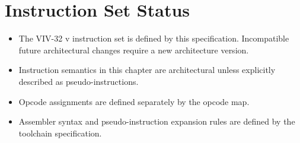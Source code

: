 \section{Instruction Set Status}

\begin{itemize}
  \item The VIV-32 v\version{} instruction set is defined by this specification.
        Incompatible future architectural changes require a new architecture version.
  \item Instruction semantics in this chapter are architectural unless explicitly
        described as pseudo-instructions.
  \item Opcode assignments are defined separately by the opcode map.
  \item Assembler syntax and pseudo-instruction expansion rules are defined by the
        toolchain specification.
\end{itemize}
